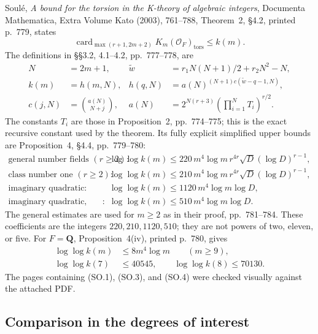 \documentclass[11pt,a4paper]{article}
\theoremstyle{definition}
\begin{document}
Soul\'e, \emph{A bound for the torsion in the K-theory of
algebraic integers}, Documenta Mathematica, Extra Volume Kato
(2003), 761--788, Theorem~2, \S4.2, printed p.~779, states
\[
 \operatorname{card}_{\max(r+1,2m+2)}
       K_m(\mathcal O_F)_{\mathrm{tors}}\leq k(m).
 \tag{SO.1}
\]
The definitions in \S\S3.2, 4.1--4.2, pp.~777--778, are
\[
\begin{aligned}
 N&=2m+1,&
 \widetilde w&=r_1N(N+1)/2+r_2N^2-N,\\
 k(m)&=h(m,N),&
 h(q,N)&=a(N)^{(N+1)c(\widetilde w-q-1,N)},\\
 c(j,N)&=\binom{a(N)}{N+j},&
 a(N)&=2^{N(r+3)}
                  \left(\prod_{i=1}^N T_i\right)^{r/2}.
\end{aligned}
 \tag{SO.2}
\]
The constants $T_i$ are those in Proposition~2,
pp.~774--775; this is the exact recursive constant used by
the theorem. Its fully explicit simplified upper bounds
are Proposition~4, \S4.4, pp.~779--780:
\[
\begin{array}{ll}
\text{general number fields }(r\geq2):&
 \log\log k(m)\leq220\,m^4\log m\,
                   r^{4r}\sqrt D(\log D)^{r-1},\\[2pt]
\text{class number one }(r\geq2):&
 \log\log k(m)\leq210\,m^4\log m\,
                   r^{4r}\sqrt D(\log D)^{r-1},\\[2pt]
\text{imaginary quadratic}:&
 \log\log k(m)\leq1120\,m^4\log m\log D,\\[2pt]
\text{imaginary quadratic, class number one}:&
 \log\log k(m)\leq510\,m^4\log m\log D.
\end{array}
 \tag{SO.3}
\]
The general estimates are used for $m\geq2$ as in their proof,
pp.~781--784. These coefficients are the integers
$220,210,1120,510$; they are not powers of two, eleven, or five.
For $F=\mathbf Q$, Proposition~4(iv), printed p.~780, gives
\[
\begin{aligned}
 \log\log k(m)&\leq8m^4\log m\qquad(m\geq9),\\
 \log\log k(7)&\leq40545,\qquad
 \log\log k(8)\leq70130.
\end{aligned}
 \tag{SO.4}
\]
The pages containing (SO.1), (SO.3), and (SO.4) were checked
visually against the attached PDF.

\subsection{Comparison in the degrees of interest}
\end{document}
